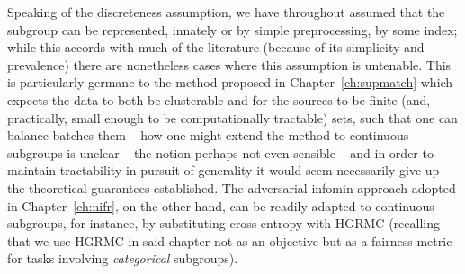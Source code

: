 Speaking of the discreteness assumption, we have throughout assumed that the subgroup can be
represented, innately or by simple preprocessing, by some index; while this accords with much of
the literature (because of its simplicity and prevalence) there are nonetheless cases where this
assumption is untenable.
%
This is particularly germane to the method proposed in Chapter~\ref{ch:supmatch} which expects the
data to both be clusterable and for the sources to be finite (and, practically, small enough to be
computationally tractable) sets, such that one can balance batches \wrt{} them -- how one might
extend the method to continuous subgroups is unclear -- the notion perhaps not even sensible -- and
in order to maintain tractability in pursuit of generality it would seem necessarily give up the
theoretical guarantees established.
%
The adversarial-infomin approach adopted in Chapter~\ref{ch:nifr}, on the other hand, can be
readily adapted to continuous subgroups, for instance, by substituting cross-entropy with
\ac{HGRMC} (recalling that we use \ac{HGRMC} in said chapter not as an objective but as a fairness
metric for tasks involving \emph{categorical} subgroups).

